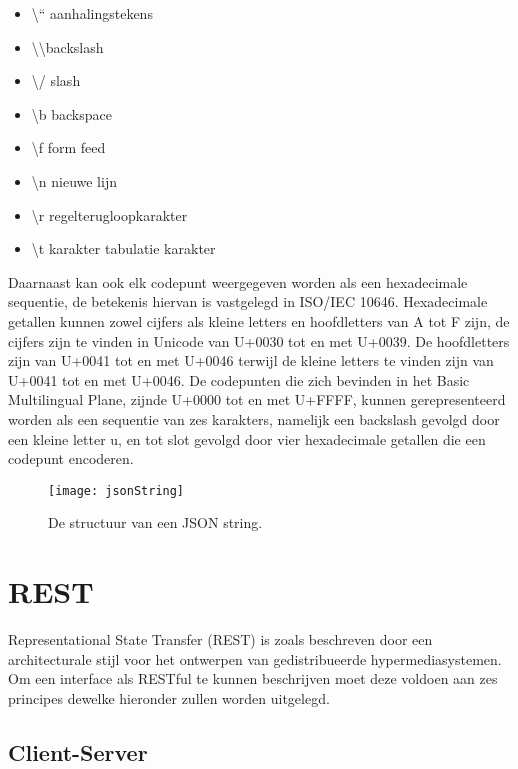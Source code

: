 \begin{itemize}
    \item \textbackslash “  aanhalingstekens
    \item \textbackslash \textbackslash \space backslash
    \item \textbackslash  / slash
    \item \textbackslash b backspace
    \item \textbackslash f form feed
    \item \textbackslash n nieuwe lijn
    \item \textbackslash r regelterugloopkarakter
    \item \textbackslash t karakter tabulatie karakter                 
\end{itemize}

Daarnaast kan ook elk codepunt weergegeven worden als een hexadecimale sequentie, de betekenis hiervan is vastgelegd in ISO/IEC 10646. Hexadecimale getallen kunnen zowel cijfers als kleine letters en hoofdletters van A tot F zijn, de cijfers zijn te vinden in Unicode van U+0030 tot en met U+0039. De hoofdletters zijn van U+0041 tot en met U+0046 terwijl de kleine letters te vinden zijn van U+0041 tot en met U+0046.
De codepunten die zich bevinden in het Basic Multilingual Plane, zijnde U+0000 tot en met U+FFFF, kunnen gerepresenteerd worden als een sequentie van zes karakters, namelijk een backslash gevolgd door een kleine letter u, en tot slot gevolgd door vier hexadecimale getallen die een codepunt encoderen.

\begin{figure}[h]
    \centering
    \texttt{[image: jsonString]}
    \caption[JSON String]{De structuur van een JSON string.}
    \label{fig:jsonString}
\end{figure}


\section{REST}
\label{sec:REST}

Representational State Transfer (REST) is zoals beschreven door \textcite{Fielding2000} een architecturale stijl voor het ontwerpen van gedistribueerde hypermediasystemen. Om een interface als RESTful te kunnen beschrijven moet deze voldoen aan zes principes dewelke hieronder zullen worden uitgelegd. 

\subsection{Client-Server}
\label{subsec:Client-Server}

